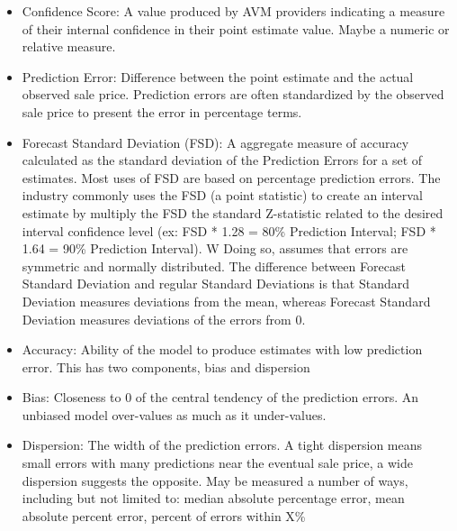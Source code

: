 \documentclass[colTwo]{anon}
\theoremstyle{definition}
\begin{document}
\begin{itemize}
\item Confidence Score: A value produced by AVM providers indicating a measure of their internal confidence in their point estimate value.  Maybe a numeric or relative measure.
\item Prediction Error: Difference between the point estimate and the actual observed sale price. Prediction errors are often standardized by the observed sale price to present the error in percentage terms.
\item Forecast Standard Deviation (FSD):  A aggregate measure of accuracy calculated as the standard deviation of the Prediction Errors for a set of estimates. Most uses of FSD are based on percentage prediction errors. The industry commonly uses the FSD (a point statistic) to create an interval estimate by multiply the FSD the standard Z-statistic related to the desired interval confidence level (ex: FSD * 1.28 = 80\% Prediction Interval; FSD * 1.64 = 90\% Prediction Interval). W Doing so, assumes that errors are symmetric and normally distributed. The difference between Forecast Standard Deviation and regular Standard Deviations is that Standard Deviation measures deviations from the mean, whereas Forecast Standard Deviation measures deviations of the errors from 0.
\item Accuracy: Ability of the model to produce estimates with low prediction error.  This has two components, bias and dispersion
\item Bias: Closeness to 0 of the central tendency of the prediction errors.  An unbiased model over-values as much as it under-values.
\item Dispersion: The width of the prediction errors.  A tight dispersion means small errors with many predictions near the eventual sale price, a wide dispersion suggests the opposite.  May be measured a number of ways, including but not limited to: median absolute percentage error, mean absolute percent error, percent of errors within X\%
\end{itemize}
\end{document}
